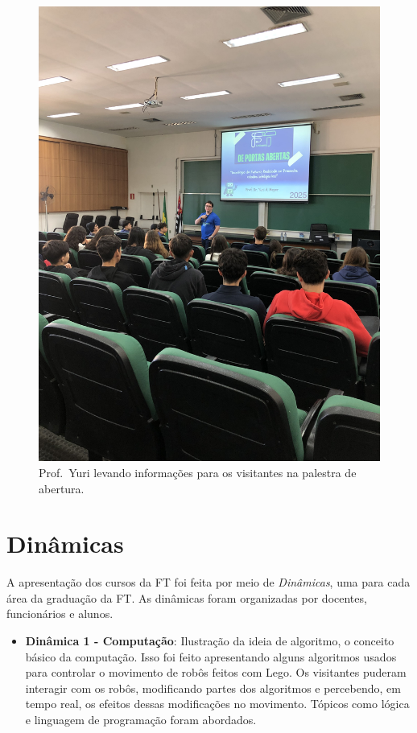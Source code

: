 \documentclass[
  letterpaper,
  DIV=11,
  numbers=noendperiod]{scrreprt}
\providecommand{\tightlist}{%
  \setlength{\itemsep}{0pt}\setlength{\parskip}{0pt}}\usepackage{longtable,booktabs,array}
\begin{document}
\begin{figure}[H]

{\centering \includegraphics[width=0.6\linewidth,height=\textheight,keepaspectratio]{planejamento/palestra-abertura.jpg}

}

\caption{Prof.~Yuri levando informações para os visitantes na palestra
de abertura.}

\end{figure}%

\section{Dinâmicas}\label{dinuxe2micas}

A apresentação dos cursos da FT foi feita por meio de \emph{Dinâmicas},
uma para cada área da graduação da FT. As dinâmicas foram organizadas
por docentes, funcionários e alunos.

\begin{itemize}
\tightlist
\item
  \textbf{Dinâmica 1 - Computação}: Ilustração da ideia de algoritmo, o
  conceito básico da computação. Isso foi feito apresentando alguns
  algoritmos usados para controlar o movimento de robôs feitos com Lego.
  Os visitantes puderam interagir com os robôs, modificando partes dos
  algoritmos e percebendo, em tempo real, os efeitos dessas modificações
  no movimento. Tópicos como lógica e linguagem de programação foram
  abordados.
\end{itemize}
\end{document}
